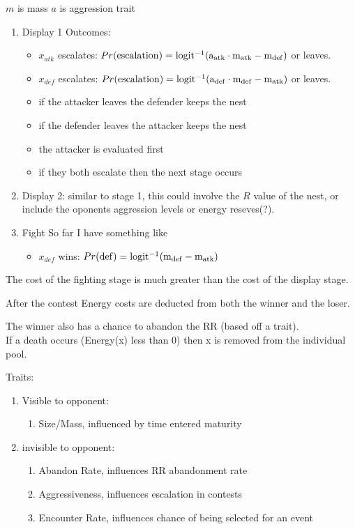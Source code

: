 \documentclass[a4paper,11pt]{article}
\begin{document}
$m$ is mass
$a$ is aggression trait
\begin{enumerate}
    \item Display 1
        Outcomes:
        \begin{itemize}
            \item $x_{atk}$ escalates: 
                $Pr(\rm{escalation}) =  logit^{-1}(a_{atk} \cdot m_{atk} - m_{def})$
                or leaves.
            \item $x_{def}$ escalates:
                $Pr(\rm{escalation}) =  logit^{-1}(a_{def} \cdot m_{def} - m_{atk})$ 
                or leaves.
            \item if the attacker leaves the defender keeps the nest
            \item if the defender leaves the attacker keeps the nest
            \item the attacker is evaluated first
            \item if they both escalate then the next stage occurs
        \end{itemize}
    \item Display 2:
        similar to stage 1, this could involve the $R$ value of the nest, or include the oponents aggression levels or energy reseves(?).
    \item Fight
        So far I have something like
        \begin{itemize}
            \item $x_{def}$ wins:
            $Pr(\rm{def}) = logit^{-1}(m_{def} - m_{atk})$
        \end{itemize}
\end{enumerate}
The cost of the fighting stage is much greater than the cost of the display stage.

After the contest Energy costs are deducted from both the winner and the loser.

The winner also has a chance to abandon the RR (based off a trait).\\

If a death occurs (Energy(x) less than 0) then x is removed from the individual pool.

Traits:
\begin{enumerate}
    \item Visible to opponent:
    \begin{enumerate}
        \item Size/Mass, influenced by time entered maturity
    \end{enumerate}
    \item invisible to opponent:
    \begin{enumerate}
        \item Abandon Rate, influences RR abandonment rate
        \item Aggressiveness, influences escalation in contests
        \item Encounter Rate, influences chance of being selected for an event
    \end{enumerate}
\end{enumerate}
\clearpage
\end{document}
